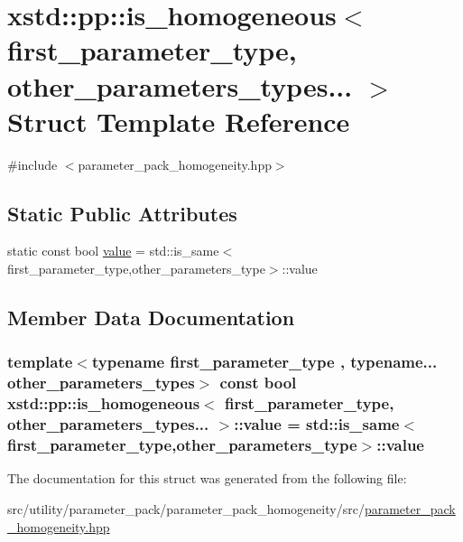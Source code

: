 \hypertarget{structxstd_1_1pp_1_1is__homogeneous_3_01first__parameter__type_00_01other__parameters__types_8_8_8_01_4}{\section{xstd\-:\-:pp\-:\-:is\-\_\-homogeneous$<$ first\-\_\-parameter\-\_\-type, other\-\_\-parameters\-\_\-types... $>$ Struct Template Reference}
\label{structxstd_1_1pp_1_1is__homogeneous_3_01first__parameter__type_00_01other__parameters__types_8_8_8_01_4}
}


{\ttfamily \#include $<$parameter\-\_\-pack\-\_\-homogeneity.\-hpp$>$}

\subsection*{Static Public Attributes}
\begin{DoxyCompactItemize}
\item 
static const bool \hyperlink{structxstd_1_1pp_1_1is__homogeneous_3_01first__parameter__type_00_01other__parameters__types_8_8_8_01_4_a7cb56d449b90e1ffbc9e9332d1faaa94}{value} = std\-::is\-\_\-same$<$first\-\_\-parameter\-\_\-type,other\-\_\-parameters\-\_\-type$>$\-::value
\end{DoxyCompactItemize}


\subsection{Member Data Documentation}
\hypertarget{structxstd_1_1pp_1_1is__homogeneous_3_01first__parameter__type_00_01other__parameters__types_8_8_8_01_4_a7cb56d449b90e1ffbc9e9332d1faaa94}{
\subsubsection[{value}]{\setlength{\rightskip}{0pt plus 5cm}template$<$typename first\-\_\-parameter\-\_\-type , typename... other\-\_\-parameters\-\_\-types$>$ const bool {\bf xstd\-::pp\-::is\-\_\-homogeneous}$<$ first\-\_\-parameter\-\_\-type, other\-\_\-parameters\-\_\-types... $>$\-::value = std\-::is\-\_\-same$<$first\-\_\-parameter\-\_\-type,other\-\_\-parameters\-\_\-type$>$\-::value\hspace{0.3cm}{\ttfamily [static]}}}\label{structxstd_1_1pp_1_1is__homogeneous_3_01first__parameter__type_00_01other__parameters__types_8_8_8_01_4_a7cb56d449b90e1ffbc9e9332d1faaa94}


The documentation for this struct was generated from the following file\-:\begin{DoxyCompactItemize}
\item 
src/utility/parameter\-\_\-pack/parameter\-\_\-pack\-\_\-homogeneity/src/\hyperlink{parameter__pack__homogeneity_8hpp}{parameter\-\_\-pack\-\_\-homogeneity.\-hpp}\end{DoxyCompactItemize}

